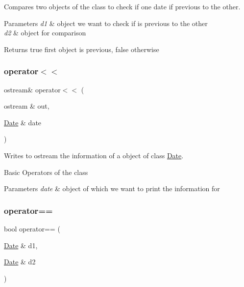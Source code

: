 Compares two objects of the class to check if one date if previous to the other. 


\begin{DoxyParams}{Parameters}
{\em d1} & object we want to check if is previous to the other \\
\hline
{\em d2} & object for comparison\\
\hline
\end{DoxyParams}
\begin{DoxyReturn}{Returns}
true first object is previous, false otherwise 
\end{DoxyReturn}
\mbox{\label{group___date_ga277b4ff7a5bea855f71b2b7f941fbc2f}} 
\subsubsection{\texorpdfstring{operator$<$$<$}{operator<<}}
{\footnotesize\ttfamily ostream\& operator$<$$<$ (\begin{DoxyParamCaption}\item[{ostream \&}]{out,  }\item[{\hyperlink{class_date}{Date} \&}]{date }\end{DoxyParamCaption})\hspace{0.3cm}{\ttfamily [friend]}}



Writes to ostream the information of a object of class \hyperlink{class_date}{Date}. 

Basic Operators of the class 
\begin{DoxyParams}{Parameters}
{\em date} & object of which we want to print the information for \\
\hline
\end{DoxyParams}
\mbox{\label{group___date_gaa932959bdd56052bc683d29b8748898f}} 
\subsubsection{\texorpdfstring{operator==}{operator==}}
{\footnotesize\ttfamily bool operator== (\begin{DoxyParamCaption}\item[{\hyperlink{class_date}{Date} \&}]{d1,  }\item[{\hyperlink{class_date}{Date} \&}]{d2 }\end{DoxyParamCaption})\hspace{0.3cm}{\ttfamily [friend]}}



